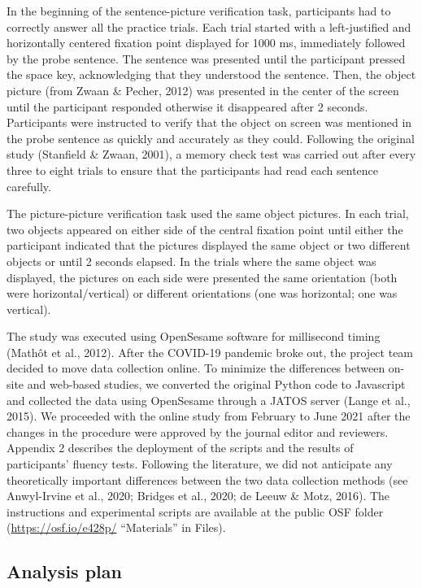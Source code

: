 \documentclass[
  man,floatsintext]{apa6}
\begin{document}
In the beginning of the sentence-picture verification task, participants had to correctly answer all the practice trials. Each trial started with a left-justified and horizontally centered fixation point displayed for 1000 ms, immediately followed by the probe sentence. The sentence was presented until the participant pressed the space key, acknowledging that they understood the sentence. Then, the object picture (from Zwaan \& Pecher, 2012) was presented in the center of the screen until the participant responded otherwise it disappeared after 2 seconds. Participants were instructed to verify that the object on screen was mentioned in the probe sentence as quickly and accurately as they could. Following the original study (Stanfield \& Zwaan, 2001), a memory check test was carried out after every three to eight trials to ensure that the participants had read each sentence carefully.

The picture-picture verification task used the same object pictures. In each trial, two objects appeared on either side of the central fixation point until either the participant indicated that the pictures displayed the same object or two different objects or until 2 seconds elapsed. In the trials where the same object was displayed, the pictures on each side were presented the same orientation (both were horizontal/vertical) or different orientations (one was horizontal; one was vertical).

The study was executed using OpenSesame software for millisecond timing (Mathôt et al., 2012). After the COVID-19 pandemic broke out, the project team decided to move data collection online. To minimize the differences between on-site and web-based studies, we converted the original Python code to Javascript and collected the data using OpenSesame through a JATOS server (Lange et al., 2015). We proceeded with the online study from February to June 2021 after the changes in the procedure were approved by the journal editor and reviewers. Appendix 2 describes the deployment of the scripts and the results of participants' fluency tests. Following the literature, we did not anticipate any theoretically important differences between the two data collection methods (see Anwyl-Irvine et al., 2020; Bridges et al., 2020; de Leeuw \& Motz, 2016). The instructions and experimental scripts are available at the public OSF folder (\url{https://osf.io/e428p/} ``Materials'' in Files).

\hypertarget{analysis-plan}{%
\subsection{Analysis plan}\label{analysis-plan}}
\end{document}

